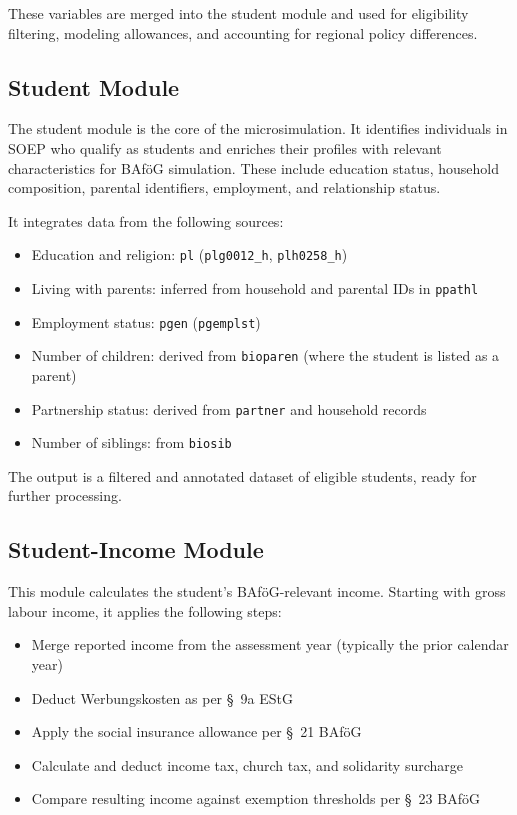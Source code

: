 These variables are merged into the student module and used for eligibility filtering, modeling allowances, and accounting for regional policy differences.

\subsection{Student Module}

The student module is the core of the microsimulation. It identifies individuals in SOEP who qualify as students and enriches their profiles with relevant characteristics for BAföG simulation. These include education status, household composition, parental identifiers, employment, and relationship status.

It integrates data from the following sources:

\begin{itemize}
  \item Education and religion: \texttt{pl} (\texttt{plg0012\_h}, \texttt{plh0258\_h})
  \item Living with parents: inferred from household and parental IDs in \texttt{ppathl}
  \item Employment status: \texttt{pgen} (\texttt{pgemplst})
  \item Number of children: derived from \texttt{bioparen} (where the student is listed as a parent)
  \item Partnership status: derived from \texttt{partner} and household records
  \item Number of siblings: from \texttt{biosib}
\end{itemize}

The output is a filtered and annotated dataset of eligible students, ready for further processing.

\subsection{Student-Income Module}

This module calculates the student's BAföG-relevant income. Starting with gross labour income, it applies the following steps:

\begin{itemize}
  \item Merge reported income from the assessment year (typically the prior calendar year)
  \item Deduct Werbungskosten as per §~9a EStG
  \item Apply the social insurance allowance per §~21 BAföG
  \item Calculate and deduct income tax, church tax, and solidarity surcharge
  \item Compare resulting income against exemption thresholds per §~23 BAföG
\end{itemize}

